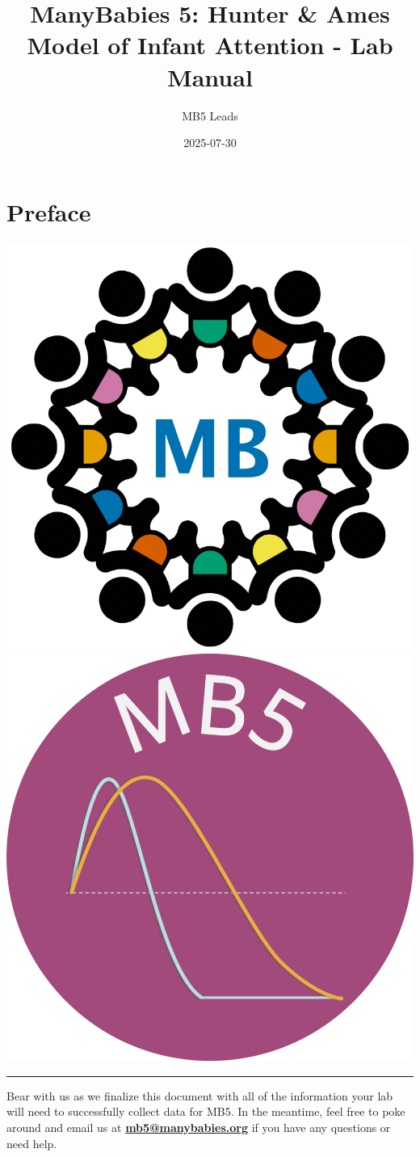 \documentclass[
  letterpaper,
  DIV=11,
  numbers=noendperiod,
  oneside]{scrreprt}
\title{ManyBabies 5: Hunter \& Ames Model of Infant Attention - Lab
Manual}
\author{MB5 Leads}
\date{2025-07-30}
\renewcommand*\contentsname{Table of contents}
\newcommand\contentsname{Table of contents}
\begin{document}
\maketitle

\renewcommand*\contentsname{Table of contents}
{
\hypersetup{linkcolor=}
\setcounter{tocdepth}{2}
\tableofcontents
}


\chapter*{Preface}\label{sec-preface}


\href{https://manybabies.org/}{\includegraphics[width=0.35\linewidth,height=\textheight,keepaspectratio]{images/mb-logo.png}}
\href{https://manybabies.org/MB5}{\includegraphics[width=0.35\linewidth,height=\textheight,keepaspectratio]{images/mb5-logo.png}}

\begin{center}\rule{0.5\linewidth}{0.5pt}\end{center}

\begin{tcolorbox}[enhanced jigsaw, colbacktitle=quarto-callout-important-color!10!white, coltitle=black, colframe=quarto-callout-important-color-frame, arc=.35mm, colback=white, left=2mm, opacityback=0, opacitybacktitle=0.6, breakable, bottomtitle=1mm, titlerule=0mm, rightrule=.15mm, leftrule=.75mm, toptitle=1mm, title=\textcolor{quarto-callout-important-color}{\faExclamation}\hspace{0.5em}{IMPORTANT! This lab manual is still UNDER DEVELOPMENT!}, bottomrule=.15mm, toprule=.15mm]

Bear with us as we finalize this document with all of the information
your lab will need to successfully collect data for MB5. In the
meantime, feel free to poke around and email us at
\href{mailto:mb5@manybabies.org}{\textbf{mb5@manybabies.org}} if you
have any questions or need help.

\end{tcolorbox}
\end{document}
